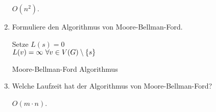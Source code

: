 \documentclass[a4paper,10pt]{scrreprt}
\begin{document}
\begin{enumerate}
		$O(n^2)$.
		\item Formuliere den Algorithmus von Moore-Bellman-Ford.
		\begin{algorithm}
			\vspace*{5pt}
			Setze $L(s) = 0$\\
			\hspace*{25pt}$L(v) = \infty~\forall v \in V(G)\setminus \{s\}$\\
			\caption{Moore-Bellman-Ford Algorithmus}
		\end{algorithm}
		\item Welche Laufzeit hat der Algorithmus von Moore-Bellman-Ford?
		
		$O(m\cdot n)$.
	\end{enumerate}
\end{document}
